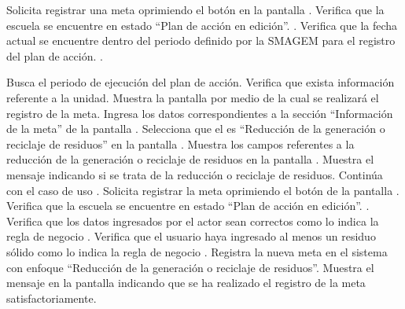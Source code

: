  
\begin{UCtrayectoria}
	\UCpaso[\UCactor] Solicita registrar una meta oprimiendo el botón  en la pantalla .
		\UCpaso[\UCsist] Verifica que la escuela se encuentre en  estado ``Plan de acción en edición''. .
    \UCpaso[\UCsist] Verifica que la fecha actual se encuentre dentro del periodo definido por la SMAGEM para el registro del plan de acción. .

	\UCpaso[\UCsist] Busca el periodo de ejecución del plan de acción.
	\UCpaso[\UCsist] Verifica que exista información referente a la unidad. 
	\UCpaso[\UCsist] Muestra la pantalla  por medio de la cual se realizará el registro de la meta.
	\UCpaso[\UCactor] Ingresa los datos correspondientes a la sección ``Información de la meta'' de la pantalla . \label{cuprs1:ingresaDatos}
	\UCpaso[\UCactor] Selecciona que el  es ``Reducción de la generación o reciclaje de residuos'' en la pantalla . 
	\UCpaso[\UCsist] Muestra los campos referentes a la reducción de la generación o reciclaje de residuos en la pantalla .
	\UCpaso[\UCsist] Muestra el mensaje  indicando si se trata de la reducción o reciclaje de residuos.
	\UCpaso[\UCactor] Continúa con el caso de uso .
	\UCpaso[\UCactor] Solicita registrar la meta oprimiendo el botón  de la pantalla . 
	\UCpaso[\UCsist] Verifica que la escuela se encuentre en  estado ``Plan de acción en edición''. .	
	\UCpaso[\UCsist] Verifica que los datos ingresados por el actor sean correctos como lo indica la regla de negocio .   
	\UCpaso[\UCsist] Verifica que el usuario haya ingresado al menos un residuo sólido como lo indica la regla de negocio . 
	\UCpaso[\UCsist] Registra la nueva meta en el sistema con enfoque ``Reducción de la generación o reciclaje de residuos''.
	\UCpaso[\UCsist] Muestra el mensaje  en la pantalla  indicando que se ha realizado el registro de la meta satisfactoriamente. \label{cuprs1:muestraMensaje}
\end{UCtrayectoria}


